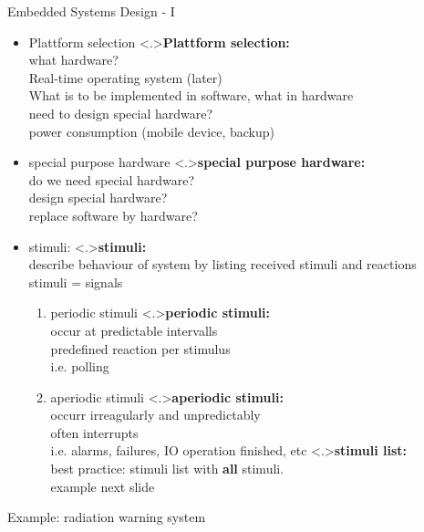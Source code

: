 \documentclass[ngerman={babel}, utf8, bigger, xcolor={table,dvipsnames}, ompress, hyperref={bookmarks,colorlinks}]{beamer}
\begin{document}
\begin{frame}{Embedded Systems Design - I}
	\begin{itemize}
		\item Plattform selection
		\note<.>{\textbf{Plattform selection:}\\ what hardware? \\ Real-time operating system {\tiny (later)}\\ What is to be implemented in software, what in hardware \\ need to design special hardware? \\ power consumption (mobile device, backup)}
		\item special purpose hardware
		\note<.>{\textbf{special purpose hardware:}\\ do we need special hardware? \\ design special hardware? \\ replace software by hardware?}
		\item stimuli:
		\note<.>{\textbf{stimuli:}\\ describe behaviour of system by listing received stimuli and reactions \\ stimuli = signals \\}
			\begin{enumerate}
				\item periodic stimuli
				\note<.>{\textbf{periodic stimuli:}\\occur at predictable intervalls \\ predefined reaction per stimulus \\ i.e. polling}
				\item aperiodic stimuli
				\note<.>{\textbf{aperiodic stimuli:}\\ occurr irreagularly and unpredictably \\ often interrupts \\ i.e. alarms, failures, IO operation finished, etc}
				\note<.>{\textbf{stimuli list:}\\best practice: stimuli list with \textbf{all} stimuli. \\ \vspace*{2em} example next slide}
			\end{enumerate}
	\end{itemize}
\end{frame}

\begin{frame}{Example: radiation warning system}
	
\end{frame}
\end{document}
